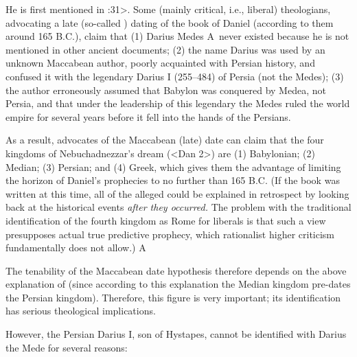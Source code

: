 
He is first mentioned in :31>. Some (mainly critical, i.e., liberal) theologians, advocating a late (so-called ) dating of the book of Daniel (according to them around 165 B.C.), claim that
(1) Darius Medes 
\insertCite A\left\
never existed because he is not mentioned in other ancient documents; (2) the name Darius was used by an unknown Maccabean author, poorly acquainted with Persian
history, and confused it with the legendary Darius I (255--484) of Persia (not the Medes); (3) the author erroneously assumed that Babylon was conquered by Medea, not Persia, and that under the leadership of this
legendary \uv{Darius} the Medes ruled the world empire for several years before it fell into the hands of the Persians.

As a result, advocates of the Maccabean (late) date can claim that the four kingdoms of Nebuchadnezzar's dream (<Dan 2>) are (1) Babylonian; (2) Median; (3) Persian; and (4) Greek, which
gives them the advantage of limiting the horizon of Daniel's prophecies to no further than 165 B.C. (If the book was written at this time, all of the alleged \uv{prophecies} could be explained in retrospect by looking back at the historical events {\it after they occurred.\/} The problem with the traditional identification of the fourth kingdom as Rome for liberals is that such a view presupposes actual true predictive prophecy, which rationalist higher criticism fundamentally does not allow.)
\insertCite A\right

The tenability of the Maccabean date hypothesis therefore depends on the above explanation of  (since according to this explanation the Median kingdom pre-dates the Persian kingdom).
Therefore, this figure is very important; its identification has serious theological implications.

However, the Persian Darius I, son of Hystapes, cannot be identified with Darius the Mede for several reasons:




